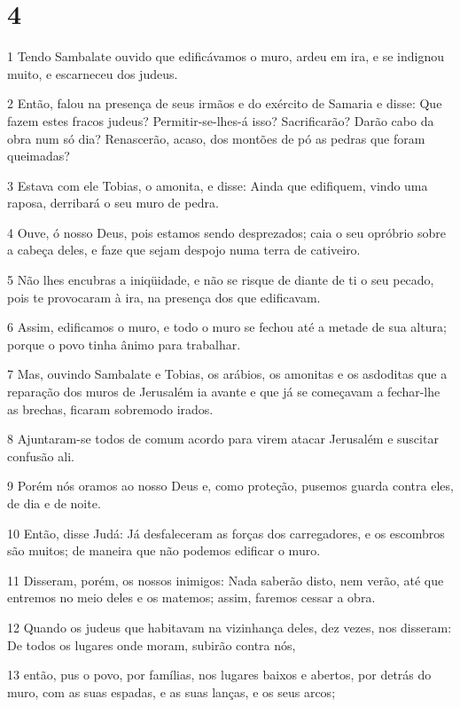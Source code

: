 \chapter{4}

\par 1 Tendo Sambalate ouvido que edificávamos o muro, ardeu em ira, e se indignou muito, e escarneceu dos judeus.
\par 2 Então, falou na presença de seus irmãos e do exército de Samaria e disse: Que fazem estes fracos judeus? Permitir-se-lhes-á isso? Sacrificarão? Darão cabo da obra num só dia? Renascerão, acaso, dos montões de pó as pedras que foram queimadas?
\par 3 Estava com ele Tobias, o amonita, e disse: Ainda que edifiquem, vindo uma raposa, derribará o seu muro de pedra.
\par 4 Ouve, ó nosso Deus, pois estamos sendo desprezados; caia o seu opróbrio sobre a cabeça deles, e faze que sejam despojo numa terra de cativeiro.
\par 5 Não lhes encubras a iniqüidade, e não se risque de diante de ti o seu pecado, pois te provocaram à ira, na presença dos que edificavam.
\par 6 Assim, edificamos o muro, e todo o muro se fechou até a metade de sua altura; porque o povo tinha ânimo para trabalhar.
\par 7 Mas, ouvindo Sambalate e Tobias, os arábios, os amonitas e os asdoditas que a reparação dos muros de Jerusalém ia avante e que já se começavam a fechar-lhe as brechas, ficaram sobremodo irados.
\par 8 Ajuntaram-se todos de comum acordo para virem atacar Jerusalém e suscitar confusão ali.
\par 9 Porém nós oramos ao nosso Deus e, como proteção, pusemos guarda contra eles, de dia e de noite.
\par 10 Então, disse Judá: Já desfaleceram as forças dos carregadores, e os escombros são muitos; de maneira que não podemos edificar o muro.
\par 11 Disseram, porém, os nossos inimigos: Nada saberão disto, nem verão, até que entremos no meio deles e os matemos; assim, faremos cessar a obra.
\par 12 Quando os judeus que habitavam na vizinhança deles, dez vezes, nos disseram: De todos os lugares onde moram, subirão contra nós,
\par 13 então, pus o povo, por famílias, nos lugares baixos e abertos, por detrás do muro, com as suas espadas, e as suas lanças, e os seus arcos;
